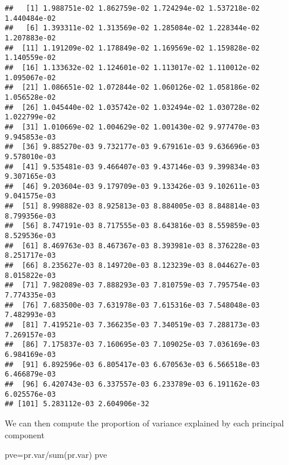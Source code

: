\documentclass[
]{article}
\newenvironment{Shaded}{\begin{snugshade}}{\end{snugshade}}
\newcommand{\FunctionTok}[1]{\textcolor[rgb]{0.00,0.00,0.00}{#1}}
\newcommand{\NormalTok}[1]{#1}
\newcommand{\OtherTok}[1]{\textcolor[rgb]{0.56,0.35,0.01}{#1}}
\newcommand{\SpecialCharTok}[1]{\textcolor[rgb]{0.00,0.00,0.00}{#1}}
\begin{document}
\begin{verbatim}
##   [1] 1.988751e-02 1.862759e-02 1.724294e-02 1.537218e-02 1.440484e-02
##   [6] 1.393311e-02 1.313569e-02 1.285084e-02 1.228344e-02 1.207883e-02
##  [11] 1.191209e-02 1.178849e-02 1.169569e-02 1.159828e-02 1.140559e-02
##  [16] 1.133632e-02 1.124601e-02 1.113017e-02 1.110012e-02 1.095067e-02
##  [21] 1.086651e-02 1.072844e-02 1.060126e-02 1.058186e-02 1.056528e-02
##  [26] 1.045440e-02 1.035742e-02 1.032494e-02 1.030728e-02 1.022799e-02
##  [31] 1.010669e-02 1.004629e-02 1.001430e-02 9.977470e-03 9.945853e-03
##  [36] 9.885270e-03 9.732177e-03 9.679161e-03 9.636696e-03 9.578010e-03
##  [41] 9.535481e-03 9.466407e-03 9.437146e-03 9.399834e-03 9.307165e-03
##  [46] 9.203604e-03 9.179709e-03 9.133426e-03 9.102611e-03 9.041575e-03
##  [51] 8.998882e-03 8.925813e-03 8.884005e-03 8.848814e-03 8.799356e-03
##  [56] 8.747191e-03 8.717555e-03 8.643816e-03 8.559859e-03 8.529536e-03
##  [61] 8.469763e-03 8.467367e-03 8.393981e-03 8.376228e-03 8.251717e-03
##  [66] 8.235627e-03 8.149720e-03 8.123239e-03 8.044627e-03 8.015822e-03
##  [71] 7.982089e-03 7.888293e-03 7.810759e-03 7.795754e-03 7.774335e-03
##  [76] 7.683500e-03 7.631978e-03 7.615316e-03 7.548048e-03 7.482993e-03
##  [81] 7.419521e-03 7.366235e-03 7.340519e-03 7.288173e-03 7.269157e-03
##  [86] 7.175837e-03 7.160695e-03 7.109025e-03 7.036169e-03 6.984169e-03
##  [91] 6.892596e-03 6.805417e-03 6.670563e-03 6.566518e-03 6.466879e-03
##  [96] 6.420743e-03 6.337557e-03 6.233789e-03 6.191162e-03 6.025576e-03
## [101] 5.283112e-03 2.604906e-32
\end{verbatim}

We can then compute the proportion of variance explained by each
principal component

\begin{Shaded}
\begin{Highlighting}[]
\NormalTok{pve}\OtherTok{=}\NormalTok{pr.var}\SpecialCharTok{/}\FunctionTok{sum}\NormalTok{(pr.var)}
\NormalTok{pve}
\end{Highlighting}
\end{Shaded}
\end{document}
